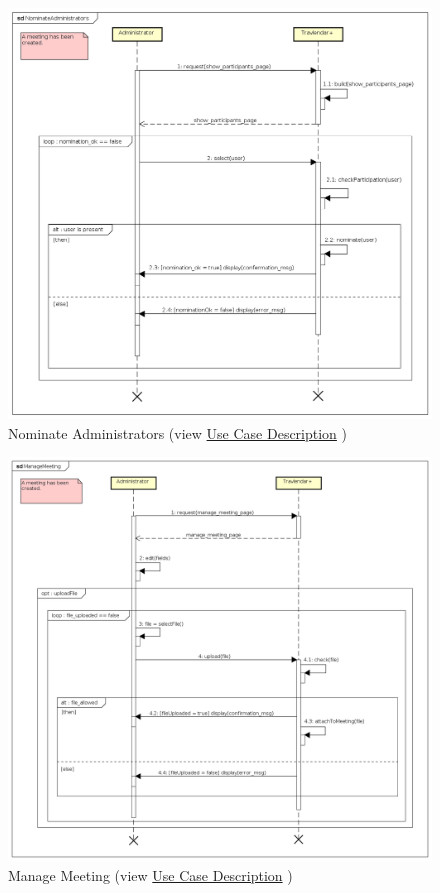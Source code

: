 \begin{figure}[h]
\centering\includegraphics[width=\textwidth]{Images/SequenceDiagrams/Admin/NominateAdministrators.png}{}
\caption[Nominate Administrators]{{Nominate Administrators}\label{SeqDiagr:NominateAdmin} (view \hyperref[UseCaseDescr:NominateAdmin]{Use Case Description} )}
\end{figure}

\begin{figure}[h]
\centering\includegraphics[width=\textwidth]{Images/SequenceDiagrams/Admin/ManageMeeting.png}{}
\caption[Manage Meeting]{{Manage Meeting}\label{SeqDiagr:ManageMeeting} (view \hyperref[UseCaseDescr:ManageMeeting]{Use Case Description} )}
\end{figure}

